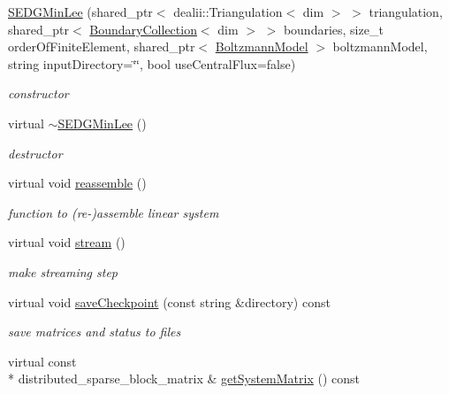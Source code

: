 \begin{DoxyCompactItemize}
\item 
\hyperlink{classnatrium_1_1SEDGMinLee_a5bcf88b62420136630f78323b9b161b8}{S\-E\-D\-G\-Min\-Lee} (shared\-\_\-ptr$<$ dealii\-::\-Triangulation$<$ dim $>$ $>$ triangulation, shared\-\_\-ptr$<$ \hyperlink{classnatrium_1_1BoundaryCollection}{Boundary\-Collection}$<$ dim $>$ $>$ boundaries, size\-\_\-t order\-Of\-Finite\-Element, shared\-\_\-ptr$<$ \hyperlink{classnatrium_1_1BoltzmannModel}{Boltzmann\-Model} $>$ boltzmann\-Model, string input\-Directory=\char`\"{}\char`\"{}, bool use\-Central\-Flux=false)
\begin{DoxyCompactList}\small\item\em constructor \end{DoxyCompactList}\item 
\hypertarget{classnatrium_1_1SEDGMinLee_a6c55a31bc4cb0e314876af7251ad8ce3}{virtual \hyperlink{classnatrium_1_1SEDGMinLee_a6c55a31bc4cb0e314876af7251ad8ce3}{$\sim$\-S\-E\-D\-G\-Min\-Lee} ()}\label{classnatrium_1_1SEDGMinLee_a6c55a31bc4cb0e314876af7251ad8ce3}

\begin{DoxyCompactList}\small\item\em destructor \end{DoxyCompactList}\item 
virtual void \hyperlink{classnatrium_1_1SEDGMinLee_a5fa8b34df3c3bdd9f492a1e555effbe4}{reassemble} ()
\begin{DoxyCompactList}\small\item\em function to (re-\/)assemble linear system \end{DoxyCompactList}\item 
\hypertarget{classnatrium_1_1SEDGMinLee_a04707d696f7f466f17e3de055187ecd9}{virtual void \hyperlink{classnatrium_1_1SEDGMinLee_a04707d696f7f466f17e3de055187ecd9}{stream} ()}\label{classnatrium_1_1SEDGMinLee_a04707d696f7f466f17e3de055187ecd9}

\begin{DoxyCompactList}\small\item\em make streaming step \end{DoxyCompactList}\item 
virtual void \hyperlink{classnatrium_1_1SEDGMinLee_ab3cf80e18230ee7f08f4ed9883b9dadd}{save\-Checkpoint} (const string \&directory) const 
\begin{DoxyCompactList}\small\item\em save matrices and status to files \end{DoxyCompactList}\item 
\hypertarget{classnatrium_1_1SEDGMinLee_adcf3f6321cbf27f6c540a6c5f21c7cb0}{virtual const \\*
distributed\-\_\-sparse\-\_\-block\-\_\-matrix \& \hyperlink{classnatrium_1_1SEDGMinLee_adcf3f6321cbf27f6c540a6c5f21c7cb0}{get\-System\-Matrix} () const }\label{classnatrium_1_1SEDGMinLee_adcf3f6321cbf27f6c540a6c5f21c7cb0}


\end{DoxyCompactItemize}
